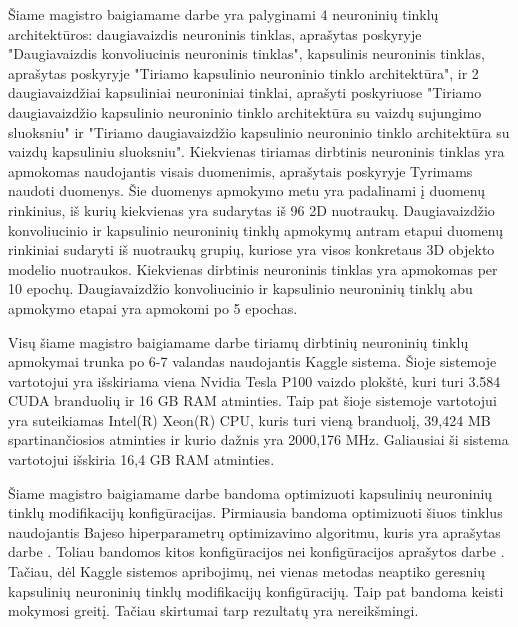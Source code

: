 
Šiame magistro baigiamame darbe yra palyginami 4 neuroninių tinklų architektūros: daugiavaizdis neuroninis tinklas, aprašytas poskyryje "Daugiavaizdis konvoliucinis neuroninis tinklas", kapsulinis neuroninis tinklas, aprašytas poskyryje "Tiriamo kapsulinio neuroninio tinklo architektūra", ir 2 daugiavaizdžiai kapsuliniai neuroniniai tinklai, aprašyti poskyriuose "Tiriamo daugiavaizdžio kapsulinio neuroninio tinklo architektūra su vaizdų sujungimo sluoksniu" ir "Tiriamo daugiavaizdžio kapsulinio neuroninio tinklo architektūra su vaizdų kapsuliniu sluoksniu". Kiekvienas tiriamas dirbtinis neuroninis tinklas yra apmokomas naudojantis visais duomenimis, aprašytais poskyryje Tyrimams naudoti duomenys. Šie duomenys apmokymo metu yra padalinami į duomenų rinkinius, iš kurių kiekvienas yra sudarytas iš 96 2D nuotraukų. Daugiavaizdžio konvoliucinio ir kapsulinio neuroninių tinklų apmokymų antram etapui duomenų rinkiniai sudaryti iš nuotraukų grupių, kuriose yra visos konkretaus 3D objekto modelio nuotraukos. Kiekvienas dirbtinis neuroninis tinklas yra apmokomas per 10 epochų. Daugiavaizdžio konvoliucinio ir kapsulinio neuroninių tinklų abu apmokymo etapai yra apmokomi po 5 epochas.

Visų šiame magistro baigiamame darbe tiriamų dirbtinių neuroninių tinklų apmokymai trunka po 6-7 valandas naudojantis Kaggle sistema. Šioje sistemoje vartotojui yra išskiriama viena Nvidia Tesla P100 vaizdo plokštė, kuri turi 3.584 CUDA branduolių ir 16 GB RAM atminties. Taip pat šioje sistemoje vartotojui yra suteikiamas Intel(R) Xeon(R) CPU, kuris turi vieną branduolį, 39,424 MB spartinančiosios atminties ir kurio dažnis yra 2000,176 MHz. Galiausiai ši sistema vartotojui išskiria 16,4 GB RAM atminties.

Šiame magistro baigiamame darbe bandoma optimizuoti kapsulinių neuroninių tinklų modifikacijų konfigūracijas. Pirmiausia bandoma optimizuoti šiuos tinklus naudojantis Bajeso hiperparametrų optimizavimo algoritmu, kuris yra aprašytas darbe \cite{bayes}. Toliau bandomos kitos konfigūracijos nei konfigūracijos aprašytos darbe \cite{capsNet}. Tačiau, dėl Kaggle sistemos apribojimų, nei vienas metodas neaptiko geresnių kapsulinių neuroninių tinklų modifikacijų konfigūracijų. Taip pat bandoma 
keisti mokymosi greitį. Tačiau skirtumai tarp rezultatų yra nereikšmingi.


